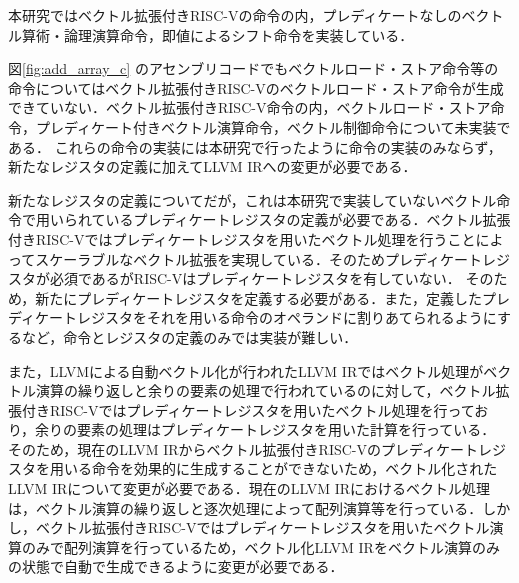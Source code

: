 
本研究ではベクトル拡張付きRISC-Vの命令の内，プレディケートなしのベクトル算術・論理演算命令，即値によるシフト命令を実装している．

図\ref{fig:add_array_c}
のアセンブリコードでもベクトルロード・ストア命令等の命令についてはベクトル拡張付きRISC-Vのベクトルロード・ストア命令が生成できていない．ベクトル拡張付きRISC-V命令の内，ベクトルロード・ストア命令，プレディケート付きベクトル演算命令，ベクトル制御命令について未実装である．
これらの命令の実装には本研究で行ったように命令の実装のみならず，新たなレジスタの定義に加えてLLVM IRへの変更が必要である．

新たなレジスタの定義についてだが，これは本研究で実装していないベクトル命令で用いられているプレディケートレジスタの定義が必要である．ベクトル拡張付きRISC-Vではプレディケートレジスタを用いたベクトル処理を行うことによってスケーラブルなベクトル拡張を実現している．そのためプレディケートレジスタが必須であるがRISC-Vはプレディケートレジスタを有していない．
そのため，新たにプレディケートレジスタを定義する必要がある．また，定義したプレディケートレジスタをそれを用いる命令のオペランドに割りあてられるようにするなど，命令とレジスタの定義のみでは実装が難しい．

また，LLVMによる自動ベクトル化が行われたLLVM IRではベクトル処理がベクトル演算の繰り返しと余りの要素の処理で行われているのに対して，ベクトル拡張付きRISC-Vではプレディケートレジスタを用いたベクトル処理を行っており，余りの要素の処理はプレディケートレジスタを用いた計算を行っている．
そのため，現在のLLVM IRからベクトル拡張付きRISC-Vのプレディケートレジスタを用いる命令を効果的に生成することができないため，ベクトル化されたLLVM IRについて変更が必要である．現在のLLVM IRにおけるベクトル処理は，ベクトル演算の繰り返しと逐次処理によって配列演算等を行っている．しかし，ベクトル拡張付きRISC-Vではプレディケートレジスタを用いたベクトル演算のみで配列演算を行っているため，ベクトル化LLVM IRをベクトル演算のみの状態で自動で生成できるように変更が必要である．